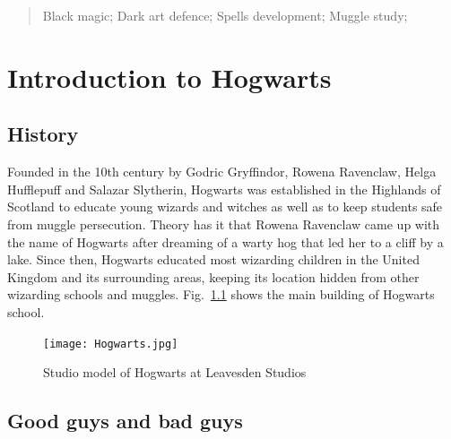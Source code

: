 \documentclass{swfuthesise}
\begin{document}
\maketitle

\begin{abstract}
  \lipsum[1-3]

  \begin{keyword}
    Black magic; Dark art defence; Spells development; Muggle study;
  \end{keyword}
\end{abstract}

\tableofcontents %


\chapter{Introduction to Hogwarts}
\label{cha:intr-hogw}

\section{History}
\label{sec:history}

Founded in the 10th century by Godric Gryffindor, Rowena Ravenclaw, Helga Hufflepuff and
Salazar Slytherin, Hogwarts was established in the Highlands of Scotland to educate young
wizards and witches as well as to keep students safe from muggle
persecution.\cite{harrypotter} Theory has it that Rowena Ravenclaw came up with the name
of Hogwarts after dreaming of a warty hog that led her to a cliff by a lake. Since then,
Hogwarts educated most wizarding children in the United Kingdom and its surrounding areas,
keeping its location hidden from other wizarding schools and
muggles.\cite{nla.cat-vn992642,nla.cat-vn7290756} Fig.~\ref{fig:hogwarts} shows the main building of Hogwarts school.


\begin{figure}
  \centering%
  \texttt{[image: Hogwarts.jpg]}
  \caption{Studio model of Hogwarts at Leavesden Studios\label{fig:hogwarts}}
\end{figure}

\lipsum[3-4]

\section{Good guys and bad guys}
\end{document}
